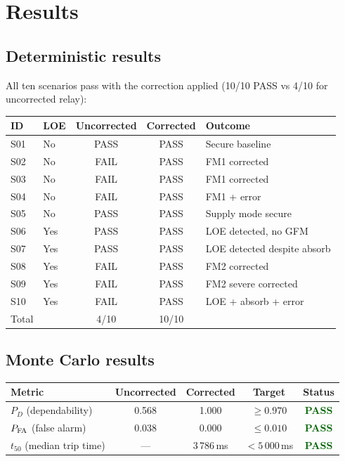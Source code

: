 \documentclass[11pt,a4paper]{article}
\begin{document}
\section{Results}
\label{sec:results}

\subsection{Deterministic results}

All ten scenarios pass with the correction applied (10/10 PASS vs 4/10 for
uncorrected relay):

\begin{center}
\begin{tabular}{llccl}
  \toprule
  ID & LOE & Uncorrected & Corrected & Outcome \\
  \midrule
  S01 & No  & PASS & PASS & Secure baseline \\
  S02 & No  & FAIL & PASS & FM1 corrected \\
  S03 & No  & FAIL & PASS & FM1 corrected \\
  S04 & No  & FAIL & PASS & FM1 + error \\
  S05 & No  & PASS & PASS & Supply mode secure \\
  S06 & Yes & PASS & PASS & LOE detected, no GFM \\
  S07 & Yes & PASS & PASS & LOE detected despite absorb \\
  S08 & Yes & FAIL & PASS & FM2 corrected \\
  S09 & Yes & FAIL & PASS & FM2 severe corrected \\
  S10 & Yes & FAIL & PASS & LOE + absorb + error \\
  \midrule
  Total & & 4/10 & 10/10 & \\
  \bottomrule
\end{tabular}
\end{center}

\subsection{Monte Carlo results}
\label{sec:mc_results}

\begin{center}
\begin{tabular}{lcccc}
  \toprule
  Metric & Uncorrected & Corrected & Target & Status \\
  \midrule
  $P_D$ (dependability) & 0.568 & 1.000 & $\geq 0.970$ & \textcolor{darkgreen}{\textbf{PASS}} \\
  $P_{\rm FA}$ (false alarm) & 0.038 & 0.000 & $\leq 0.010$ & \textcolor{darkgreen}{\textbf{PASS}} \\
  $t_{50}$ (median trip time) & — & 3\,786\,ms & $< 5\,000$\,ms & \textcolor{darkgreen}{\textbf{PASS}} \\
  \bottomrule
\end{tabular}
\end{center}
\end{document}

